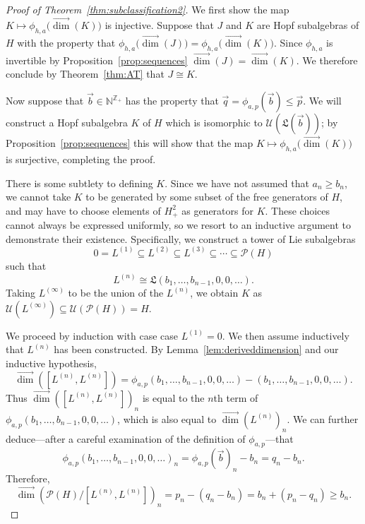 \documentclass[11pt]{amsart}
\theoremstyle{definition}
\numberwithin{equation}{section}
\def\NN{{\mathbb N}}
\def\ZZ{{\mathbb Z}}
\newcommand{\vecdim}{\overrightarrow{\dim}}
\begin{document}
\begin{proof}[Proof of Theorem~\ref{thm:subclassification2}]
We first show the map $K \mapsto \phi_{h, a} \big( \vecdim(K)\big)$ is injective.  Suppose that $J$ and $K$ are Hopf subalgebras of $H$ with the property that $\phi_{h, a} \big(\vecdim(J)) = \phi_{h, a} \big(\vecdim(K))$.  
Since $\phi_{h, a}$ is invertible by Proposition~\ref{prop:sequences} $\vecdim(J) = \vecdim(K)$.  We therefore conclude by Theorem~\ref{thm:AT} that $J \cong K$.

Now suppose that $\vec{b} \in \NN^{\ZZ_{+}}$ has the property that $\vec{q} = \phi_{a, p}(\vec{b}) \le \vec{p}$.  
We will construct a Hopf subalgebra $K$ of $H$ which is isomorphic to $\mathcal{U}(\mathfrak{L}(\vec{b}))$; by Proposition~\ref{prop:sequences} this will show that the  map $K \mapsto \phi_{h, a} \big( \vecdim(K)\big)$ is surjective, completing the proof.

There is some subtlety to defining $K$.  Since we have not assumed that $a_{n} \ge b_{n}$, we cannot take $K$ to be generated by some subset of the free generators of $H$, and may have to choose elements of $H^{2}_{+}$ as generators for $K$.  
These choices cannot always be expressed uniformly, so we resort to an inductive argument to demonstrate their existence.  
Specifically, we construct a tower of Lie subalgebras 
\[
0 = L^{(1)} \subseteq L^{(2)} \subseteq L^{(3)} \subseteq \cdots \subseteq \mathcal{P}(H)
\]
such that 
\[
L^{(n)} \cong \mathfrak{L}(b_{1}, \ldots, b_{n-1}, 0, 0, \ldots).
\]
Taking $L^{(\infty)}$ to be the union of the $L^{(n)}$, we obtain $K$ as $\mathcal{U}(L^{(\infty)}) \subseteq \mathcal{U}(\mathcal{P}(H)) = H$.

We proceed by induction with case case $L^{(1)} = 0$.  
We then assume inductively that $L^{(n)}$ has been constructed.  
By Lemma~\ref{lem:deriveddimension} and our inductive hypothesis,
\[
\vecdim([L^{(n)}, L^{(n)}])
 = 
\phi_{a, p}(b_{1}, \ldots, b_{n-1}, 0, 0, \ldots) - (b_{1}, \ldots, b_{n-1}, 0, 0, \ldots).
\]
Thus $\vecdim([L^{(n)}, L^{(n)}])_{n}$ is equal to the $n$th term of $\phi_{a, p}(b_{1}, \ldots, b_{n-1}, 0, 0, \ldots)$, which is also equal to $\vecdim(L^{(n)})_{n}$.  
We can further deduce---after a careful examination of the definition of $\phi_{a, p}$---that
\begin{equation}
\label{eq:inductivedimensionequality}
\phi_{a, p}(b_{1}, \ldots, b_{n-1}, 0, 0, \ldots)_{n}
=
\phi_{a, p}(\vec{b})_{n} - b_{n}
=
q_{n} - b_{n}.
\end{equation}
Therefore,
\[
\vecdim\left( \mathcal{P}(H) \big/ [L^{(n)}, L^{(n)}] \right)_{n}
= p_{n} - (q_{n} - b_{n})
= b_{n} + (p_{n} - q_{n})
\ge b_{n}.
\]


\end{proof}
\end{document}
